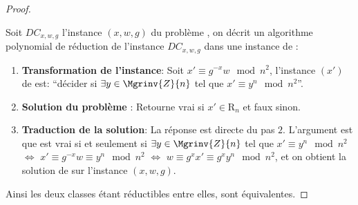 \begin{theorem}
\begin{proof}
\begin{itemize}
				Soit $DC_{x,w,g}$  l'instance $(x,w,g)$ du problème , on décrit un algorithme polynomial de réduction de l'instance $DC_{x,w,g}$
				dans une instance de :
				\begin{enumerate}
					\item \textbf{Transformation de l'instance}:
						Soit $x' \equiv g^{-x}w \mod{n^2}$, l'instance $(x')$ de  est: ``décider si $\exists y \in \Mgrinv{Z}{n}$
						tel que $x' \equiv y^n \mod{n^2}$''.
					\item \textbf{Solution du problème }:
						Retourne vrai si $x' \in \mathrm{R}_n$ et faux sinon.
					\item \textbf{Traduction de la solution}:
						La réponse est directe du pas $2$. L'argument est que  est vrai si et seulement si $\exists y \in \Mgrinv{Z}{n}$
						tel que $x'\equiv y^n\mod{n^2}$ $\iff$ $x'\equiv g^{-x}w \equiv y^n\mod{n^2}$ $\iff$ $w\equiv g^xx'\equiv g^xy^n\mod{n^2}$,
						et on obtient la solution de  sur l'instance $(x,w,g)$.
				\end{enumerate}

%
%
%	
			\end{itemize}
			Ainsi les deux classes étant réductibles entre elles, sont équivalentes. 
		\end{proof}
	\end{theorem}

